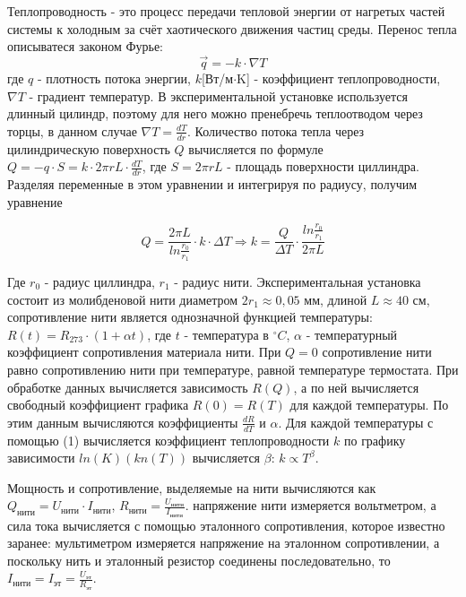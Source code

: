 \documentclass[a4paper,14pt]{article}
\begin{document}
Теплопроводность - это процесс передачи тепловой энергии от нагретых частей системы к холодным за счёт хаотического движения частиц среды. Перенос тепла описыватеся законом Фурье: 
\begin{equation}
\vec{q} = - k \cdot \nabla T
\end{equation}
где $q$ - плотность потока энергии, $k$[Вт/м$\cdot$K] - коэффициент теплопроводности, $\nabla T$ - градиент температур. В экспериментальной установке используется длинный цилиндр, поэтому для него можно пренебречь теплоотводом через торцы, в данном случае $\nabla T = \frac{dT}{dr}$. Количество потока тепла через цилиндрическую поверхность $Q$ вычисляется по формуле $Q = -q \cdot S = k \cdot 2 \pi r L \cdot \frac{dT}{dr}$, где $S = 2 \pi r L$ - площадь поверхности циллиндра. Разделяя переменные в этом уравнении и интегрируя по радиусу, получим уравнение 

\begin{equation}
Q = \frac{2 \pi L}{ln\frac{r_0}{r_1}} \cdot k \cdot \Delta T \Rightarrow k = \frac{Q}{\Delta T} \cdot \frac{ln\frac{r_0}{r_1}}{2 \pi L}
\end{equation}

Где $r_0$ - радиус циллиндра, $r_1$ - радиус нити. Экспериментальная установка состоит из молибденовой нити диаметром $2r_1 \approx 0,05$ мм, длиной $L \approx 40$ см, сопротивление нити является однозначной функцией температуры: $R(t) = R_{273} \cdot (1 + \alpha t)$, где $t$ - температура в $^{\circ}C$, $\alpha$ - температурный коэффициент сопротивления материала нити. При $Q = 0$ сопротивление нити равно сопротивлению нити при температуре, равной температуре термостата. При обработке данных вычисляется зависимость $R(Q)$, а по ней вычисляется свободный коэффициент графика $R(0) = R(T)$ для каждой температуры. По этим данным вычисляются коэффициенты $\frac{dR}{dT}$ и $\alpha$. Для каждой температуры с помощью (1) вычисляется коэффициент теплопроводности $k$ по графику зависимости $ln(K)(kn(T))$ вычисляется $\beta$: $k \propto T^{\beta}$.

Мощность и сопротивление, выделяемые на нити вычисляются как $Q_{\text{нити}} = U_{\text{нити}} \cdot I_{\text{нити}}$, $R_{\text{нити}} = \frac{U_{\text{нити}}}{I_{\text{нити}}}$. напряжение нити измеряется вольтметром, а сила тока вычисляется с помощью эталонного сопротивления, которое известно заранее: мультиметром измеряется напряжение на эталонном сопротивлении, а поскольку нить и эталонный резистор соединены последовательно, то $I_{\text{нити}} = I_{\text{эт}} = \frac{U_{\text{эт}}}{R_{\text{эт}}}$.
\end{document}
